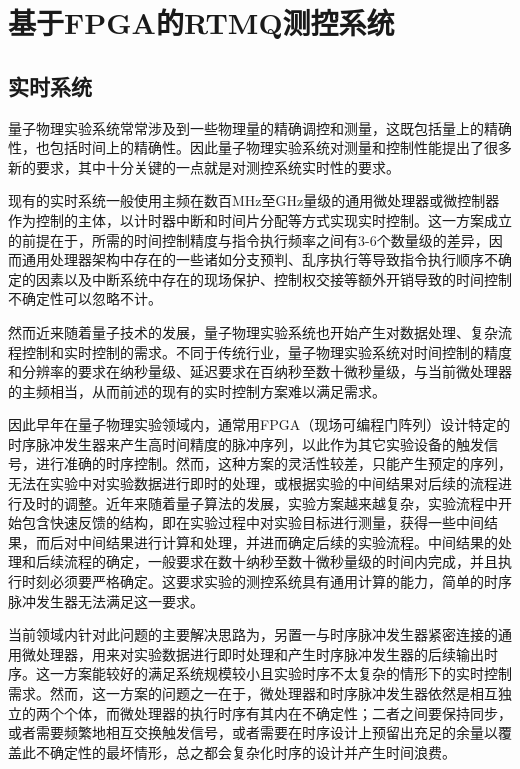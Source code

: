 
\chapter[基于FPGA的RTMQ测控系统]{基于FPGA的RTMQ测控系统}

\section[实时系统]{实时系统}

量子物理实验系统常常涉及到一些物理量的精确调控和测量，这既包括量上的精确性，也包括时间上的精确性。因此量子物理实验系统对测量和控制性能提出了很多新的要求，其中十分关键的一点就是对测控系统实时性的要求。

现有的实时系统一般使用主频在数百MHz至GHz量级的通用微处理器或微控制器作为控制的主体，以计时器中断和时间片分配等方式实现实时控制。这一方案成立的前提在于，所需的时间控制精度与指令执行频率之间有3-6个数量级的差异，因而通用处理器架构中存在的一些诸如分支预判、乱序执行等导致指令执行顺序不确定的因素以及中断系统中存在的现场保护、控制权交接等额外开销导致的时间控制不确定性可以忽略不计。

然而近来随着量子技术的发展，量子物理实验系统也开始产生对数据处理、复杂流程控制和实时控制的需求。不同于传统行业，量子物理实验系统对时间控制的精度和分辨率的要求在纳秒量级、延迟要求在百纳秒至数十微秒量级，与当前微处理器的主频相当，从而前述的现有的实时控制方案难以满足需求。

因此早年在量子物理实验领域内，通常用FPGA（现场可编程门阵列）设计特定的时序脉冲发生器来产生高时间精度的脉冲序列，以此作为其它实验设备的触发信号，进行准确的时序控制。然而，这种方案的灵活性较差，只能产生预定的序列，无法在实验中对实验数据进行即时的处理，或根据实验的中间结果对后续的流程进行及时的调整。近年来随着量子算法的发展，实验方案越来越复杂，实验流程中开始包含快速反馈的结构，即在实验过程中对实验目标进行测量，获得一些中间结果，而后对中间结果进行计算和处理，并进而确定后续的实验流程。中间结果的处理和后续流程的确定，一般要求在数十纳秒至数十微秒量级的时间内完成，并且执行时刻必须要严格确定。这要求实验的测控系统具有通用计算的能力，简单的时序脉冲发生器无法满足这一要求。

当前领域内针对此问题的主要解决思路为，另置一与时序脉冲发生器紧密连接的通用微处理器，用来对实验数据进行即时处理和产生时序脉冲发生器的后续输出时序。这一方案能较好的满足系统规模较小且实验时序不太复杂的情形下的实时控制需求。然而，这一方案的问题之一在于，微处理器和时序脉冲发生器依然是相互独立的两个个体，而微处理器的执行时序有其内在不确定性；二者之间要保持同步，或者需要频繁地相互交换触发信号，或者需要在时序设计上预留出充足的余量以覆盖此不确定性的最坏情形，总之都会复杂化时序的设计并产生时间浪费。

